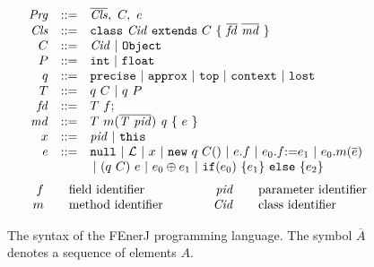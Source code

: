 \begin{figure}
\small
\[
\begin{array}{l}
\begin{array}{r@{\quad ::= \quad }l}
\mathit{Prg}      &  \overline{\mathit{Cls}},\ C,\ e \\

\mathit{Cls}      &  \mathtt{class}\ \mathit{Cid}\ \mathtt{extends}\ C\
\{\ \mathit{\overline{fd}\ \overline{md}}\ \} \\

C        &  \mathit{Cid}\ |\ \mathtt{Object} \\

P        &  \mathtt{int}\ |\ \mathtt{float} \\

q        &  \mathtt{precise}\ |\ \mathtt{approx}\ |\ \mathtt{top}
            \ |\ \mathtt{context}\ |\ \mathtt{lost}\\

T        &  q\ C \ |\ q\ P\\

\mathit{fd}   &  T\ f\mathtt{;} \\

\mathit{md}   &  T\ m(\overline{\mathit{T\ pid}})\ \mathit{q}\ \{\ e\ \} \\

x        &  \mathit{pid}\ |\ \mathtt{this} \\

e        &  \mathtt{null}\ |\ \lit\ |\ x\ |\ \mathtt{new}\ q\ C()\ |\
                e.f\ |\ e_0.f \mathtt{:=} e_1\ | \
                e_0.m(\overline{e})\\
\multicolumn{2}{l}{\hspace{1.8cm} |\
                (q\ C)\ e \ | \
                e_0 \oplus e_1 \ | \
         \mathtt{if(} e_0 \mathtt{)\ \{} e_1 \mathtt{\}\ else\ \{} e_2 \mathtt{\}}}\\

\end{array}
\\
\vspace{-2mm}
\\

\
\begin{array}{r@{\qquad}l@{\qquad\qquad}r@{\qquad}l}
f        &  \mbox{field identifier} &
\mathit{pid}      &  \mbox{parameter identifier}\\
m        &  \mbox{method identifier} &
\mathit{Cid}      &  \mbox{class identifier}\\
\end{array}
\end{array}
\]

\caption{The syntax of the FEnerJ programming language.
The symbol $\overline{A}$ denotes a sequence of elements $A$.
\label{enerj:fig:syntax}
}
\end{figure}

